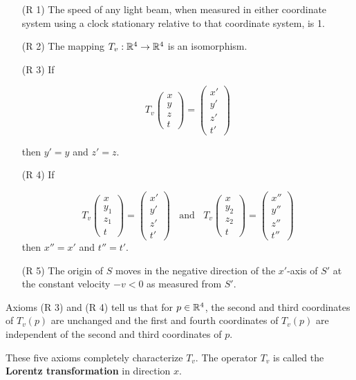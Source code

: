\begin{definition}
	\begin{enumerate}
		\item[(R 1)] The speed of any light beam, when measured in either coordinate system using a clock stationary relative to that coordinate system, is 1.
		\item[(R 2)] The mapping $T_v: \mathbb{R}^4 \to \mathbb{R}^4$ is an isomorphism.
		\item[(R 3)] If

			\[T_v\begin{pmatrix}
					x \\ y \\ z \\ t
				\end{pmatrix} = \begin{pmatrix}
					x' \\ y' \\ z' \\ t'
				\end{pmatrix}\]

			then $y' = y$ and $z' = z$.
		\item[(R 4)] If

			\[T_v\begin{pmatrix}
					x \\ y_1 \\ z_1 \\ t
				\end{pmatrix} = \begin{pmatrix}
					x' \\ y' \\ z' \\ t'
				\end{pmatrix}\ \ \ \ \text{and}\ \ \ \ T_v\begin{pmatrix}
					x \\ y_2 \\ z_2 \\ t
				\end{pmatrix} = \begin{pmatrix}
					x'' \\ y'' \\ z'' \\ t''
				\end{pmatrix}\]
			then $x'' = x'$ and $t'' = t'$.
		\item[(R 5)] The origin of $S$ moves in the negative direction of the $x'$-axis of $S'$ at the constant velocity $-v < 0$ as measured from $S'$.
	\end{enumerate}

	Axioms (R 3) and (R 4) tell us that for $p \in \mathbb{R}^4$, the second and third coordinates of $T_v(p)$ are unchanged and the first and fourth coordinates of $T_v(p)$ are independent of the second and third coordinates of $p$.

	These five axioms completely characterize $T_v$. The operator $T_v$ is called the \textbf{Lorentz transformation} in direction $x$.
\end{definition}

